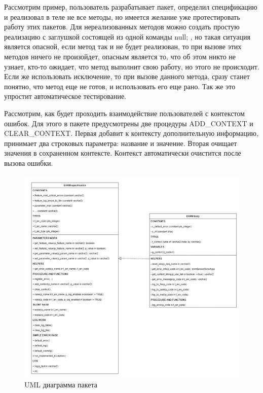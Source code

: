 Рассмотрим пример, пользователь разрабатывает пакет, определил спецификацию и реализовал в теле не все методы, но имеется желание уже протестировать работу этих пакетов. Для нереализованных методов можно создать простую реализацию с заглушкой состоящей из одной команды null; , но такая ситуация является опасной, если метод так и не будет реализован, то при вызове этих методов ничего не произойдет, опасным является то, что об этом никто не узнает, кто-то ожидает, что метод выполнит свою работу, но этого не происходит. Если же использовать исключение, то при вызове данного метода, сразу станет понятно, что метод еще не готов, и использовать его еще рано. Так же это упростит автоматическое тестирование. 

Рассмотрим, как будет проходить взаимодействие пользователей с контекстом ошибок. Для этого в пакете предусмотрены две процедуры ADD\_CONTEXT и CLEAR\_CONTEXT. Первая добавит к контексту дополнительную информацию, принимает два строковых параметра: название и значение. Вторая очищает значения в сохраненном контексте. Контекст автоматически очистится после вызова ошибки.

\begin{figure}[ht!] 
	\center
	\includegraphics [scale=1] {my_folder/img/C3_UML_diagram.png}
	\caption{UML диаграмма пакета} 
	\label{fig:C3_UML_diagram}  
\end{figure}
\FloatBarrier

